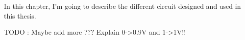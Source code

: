 
\label{cap:circuit}

In this chapter, I'm going to describe the different circuit designed and used in this thesis.

TODO : Maybe add more ???
Explain 0->0.9V and 1->1V!!




\cleardoublepage
